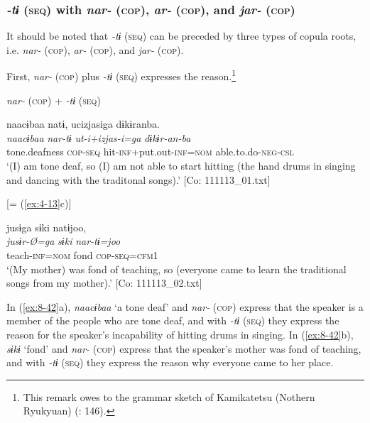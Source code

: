 \subsubsection{\textit{-tɨ} (\textsc{seq}) with \textit{nar-} (\textsc{cop}), \textit{ar-} (\textsc{cop}), and \textit{jar-} (\textsc{cop})}

It should be noted that \textit{-tɨ} (\textsc{seq}) can be preceded by three types of copula roots, i.e. \textit{nar-} (\textsc{cop}), \textit{ar-} (\textsc{cop}), and \textit{jar-} (\textsc{cop}).

First, \textit{nar-} (\textsc{cop}) plus \textit{-tɨ} (\textsc{seq}) expresses the reason.\footnote{This remark owes to the grammar sketch of Kamikatetsu (Nothern Ryukyuan) (\citealt{ShirataEtAl2011}: 146).}

\ea\label{ex:8-42}
 \textit{nar-} (\textsc{cop}) + \textit{-tɨ} (\textsc{seq})

\ea
{\TM}
\glll  naacɨbaa  natɨ,  ucizjasiga  dɨkɨranba.\\
\textit{naacɨbaa}  \textit{nar-tɨ}  \textit{ut-i+izjas-i=ga}  \textit{dɨkɨr-an-ba}\\
tone.deafness  \textsc{cop}-\textsc{seq}  hit-\textsc{inf}+put.out-\textsc{inf}=\textsc{nom}  able.to.do-\textsc{neg}-\textsc{csl}\\
\glt ‘(I) am tone deaf, so (I) am not able to start hitting (the hand drums in singing and dancing with the traditonal songs).’ [Co: 111113\_01.txt]

\ex  {}[= (\ref{ex:4-13}c)]

{\TM}
\glll  jusɨga  sɨki  natɨjoo,\\
\textit{jusɨr-Ø=ga}  \textit{sɨki}  \textit{nar-tɨ=joo}\\
teach-\textsc{inf}=\textsc{nom}  fond  \textsc{cop}-\textsc{seq}=\textsc{cfm1}\\
\glt ‘(My mother) was fond of teaching, so (everyone came to learn the traditional songs from my mother).’ [Co: 111113\_02.txt]
\z
\z

In (\ref{ex:8-42}a), \textit{naacɨbaa} ‘a tone deaf’ and \textit{nar-} (\textsc{cop}) express that the speaker is a member of the people who are tone deaf, and with \textit{-tɨ} (\textsc{seq}) they express the reason for the speaker’s incapability of hitting drums in singing. In (\ref{ex:8-42}b), \textit{sɨkɨ} ‘fond’ and \textit{nar-} (\textsc{cop}) express that the speaker’s mother was fond of teaching, and with \textit{-tɨ} (\textsc{seq}) they express the reason why everyone came to her place.

